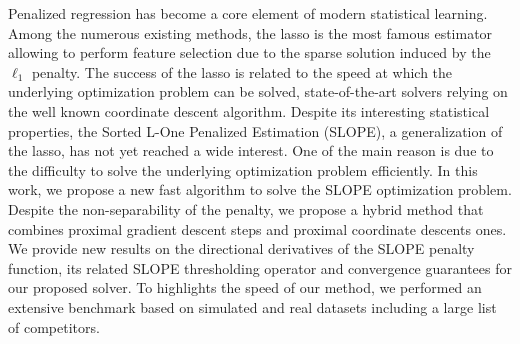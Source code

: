 
Penalized regression has become a core element of modern statistical learning. 
Among the numerous existing methods, the lasso is the most famous estimator allowing to perform feature selection due to the sparse solution induced by the $\ell_1$ penalty. 
The success of the lasso is related to the speed at which the underlying optimization problem can be solved, state-of-the-art solvers relying on the well known coordinate descent algorithm. 
Despite its interesting statistical properties, the Sorted L-One Penalized Estimation (SLOPE), a generalization of the lasso, has not yet reached a wide interest. 
One of the main reason is due to the difficulty to solve the underlying optimization problem efficiently. 
In this work, we propose a new fast algorithm to solve the SLOPE optimization problem. 
Despite the non-separability of the penalty, we propose a hybrid method that combines proximal gradient descent steps and proximal coordinate descents ones. 
We provide new results on the directional derivatives of the SLOPE penalty function, its related SLOPE thresholding operator and convergence guarantees for our proposed solver.
To highlights the speed of our method, we performed an extensive benchmark based on simulated and real datasets including a large list of competitors.
